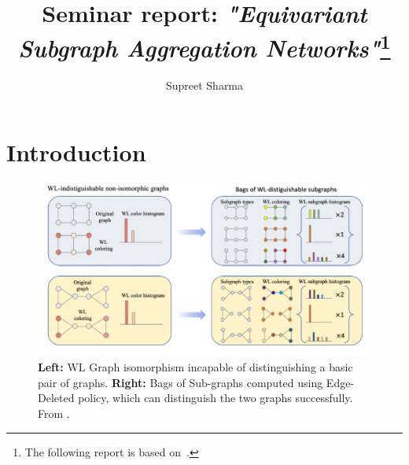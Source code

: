 \documentclass[11pt, dvipsnames, DIV=12]{scrreprt}
\title{\bfseries Seminar report: \emph{"Equivariant Subgraph Aggregation Networks"}\footnote{The following report is based on~\citep{beatrice_esan_2021}. }}
\author[1]{Supreet Sharma}
\affil[1]{RWTH Aachen University}
\date{\vspace{-30pt}}
\theoremstyle{definition}
\begin{document}
  
\maketitle
\tableofcontents
\setcounter{page}{1}

\section{Introduction}
\begin{figure}
    \centering
    \includegraphics[width=.80\textwidth]{figures/Expressive_Power.png}
    \caption{\textbf{Left:} WL Graph isomorphism incapable of distinguishing a basic pair of graphs. \textbf{Right:} Bags of Sub-graphs computed using Edge-Deleted policy, which can distinguish the two graphs successfully. From \cite{beatrice_esan_2021}.}
    \label{fig:expressive_power_wl_esan}
\end{figure}
\end{document}
